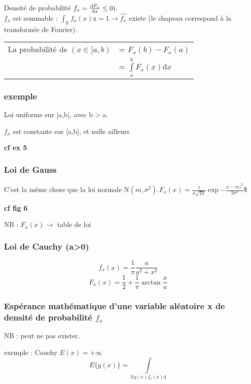 \documentclass[]{article}
\begin{document}
Densité de probabilité $f_x = \frac{\mathrm{d} F_x}{\mathrm{d}x} \leq 0$i.\\$f_x$ est
sommable :
$\int_{\mathbb{R}} f_x (x) \mathrm{x} = 1 \rightarrow \hat{f_x}$ existe
(le chapeau correspond à la transformée de Fourier).

\begin{tabular} {ll}
La probabilité de $(x \in ]a,b)$ &= $F_x(b) - F_x(a)$ \\
&= $\int\limits_a^b F_x(x) \mathrm{d}x$ \\
\end{tabular}

\subsubsection{exemple}

Loi uniforme sur {[}a,b{]}, avec b \textgreater{} a.

$f_x$ est constante sur {[}a,b{]}, et nulle ailleurs

\textbf{cf ex 5}

\subsubsection{Loi de Gauss}

C'est la même chose que la loi normale
$\mathrm{N} (m,\sigma^2). $$F_x(x) = \frac{1}{\sigma \sqrt{2\pi}} \exp{-\frac{x - m)^2}{2\sigma^2}}$\$

\textbf{cf fig 6}

NB : $F_x(x) \rightarrow$ table de loi

\subsubsection{Loi de Cauchy (a\textgreater{}0)}

\[f_x(x) = \frac{1}{\pi} \frac{a}{a^2 + x^2}\]
\[F_x(x) = \frac{1}{2} + \frac{1}{\pi}\arctan{\frac{x}{a}}\]

\subsubsection{Espérance mathématique d'une variable aléatoire x de
densité de probabilité $f_x$}


NB : peut ne pas exister.

exemple : Cauchy $E(x)= +\infty$
\[E\{g(x)\} = \int\limits_{\mathbb{R} g(x)f_x(x) \mathrm{d}}\]
\end{document}
